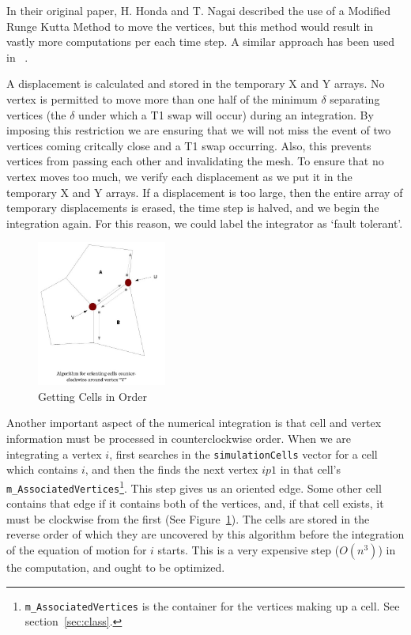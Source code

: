 In their original paper, H. Honda and T. Nagai described the use of a Modified Runge Kutta Method\cite{HondaNagai} to move the vertices, but this method would result in vastly more computations per each time step. A similar approach has been used in ~\cite{WO, ChasteMain}. 

A displacement is calculated and stored in the temporary X and Y arrays. No vertex is permitted to move more than one half of the minimum $\delta$ separating vertices (the $\delta$ under which a T1 swap will occur) during an integration. By imposing this restriction we are ensuring that we will not miss the event of two vertices coming critcally close and a T1 swap occurring. Also, this prevents vertices from passing each other and invalidating the mesh. To ensure that no vertex moves too much, we verify each displacement as we put it in the temporary X and Y arrays. If a displacement is too large, then the entire array of temporary displacements is erased, the time step is halved, and we begin the integration again. For this reason, we could label the integrator as `fault tolerant'.

\begin{figure}
\begin{center}
\includegraphics[width=0.38\textwidth]{../diagrams/counterclockwise.jpg}
\end{center}
\caption{Getting Cells in Order}
\label{fig:ctrclockwise}
\end{figure}

Another important aspect of the numerical integration is that cell and vertex information must be processed in counterclockwise order. When we are integrating a vertex $i$,  first searches in the \texttt{simulationCells} vector for a cell which contains $i$, and then the finds the next vertex $ip1$ in that cell's \texttt{m\_AssociatedVertices}\footnote{\texttt{m\_AssociatedVertices} is the container for the vertices making up a cell. See section~\ref{sec:class}.}. This step gives us an oriented edge. Some other cell contains that edge if it contains both of the vertices, and, if that cell exists, it must be clockwise from the first (See Figure~\ref{fig:ctrclockwise}). The cells are stored in the reverse order of which they are uncovered by this algorithm before the integration of the equation of motion for $i$ starts. This is a very expensive step ($O(n^3)$) in the computation, and ought to be optimized.

